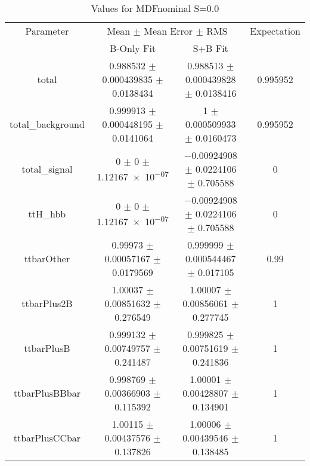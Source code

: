 \begin{table}
\centering
\caption{Values for MDFnominal S=0.0}
\begin{tabular}{cccc}
\toprule
Parameter & \multicolumn{2}{c}{Mean $\pm$ Mean Error $\pm$ RMS} & Expectation\\
 & B-Only Fit & S+B Fit & \\
\midrule
total & \num{0.988532} $\pm$ \num{0.000439835} $\pm$ \num{0.0138434} & \num{0.988513} $\pm$ \num{0.000439828} $\pm$ \num{0.0138416} & \num{0.995952}\\
total\_background & \num{0.999913} $\pm$ \num{0.000448195} $\pm$ \num{0.0141064} & \num{1} $\pm$ \num{0.000509933} $\pm$ \num{0.0160473} & \num{0.995952}\\
total\_signal & \num{0} $\pm$ \num{0} $\pm$ \num{1.12167e-07} & \num{-0.00924908} $\pm$ \num{0.0224106} $\pm$ \num{0.705588} & \num{0}\\
ttH\_hbb & \num{0} $\pm$ \num{0} $\pm$ \num{1.12167e-07} & \num{-0.00924908} $\pm$ \num{0.0224106} $\pm$ \num{0.705588} & \num{0}\\
ttbarOther & \num{0.99973} $\pm$ \num{0.00057167} $\pm$ \num{0.0179569} & \num{0.999999} $\pm$ \num{0.000544467} $\pm$ \num{0.017105} & \num{0.99}\\
ttbarPlus2B & \num{1.00037} $\pm$ \num{0.00851632} $\pm$ \num{0.276549} & \num{1.00007} $\pm$ \num{0.00856061} $\pm$ \num{0.277745} & \num{1}\\
ttbarPlusB & \num{0.999132} $\pm$ \num{0.00749757} $\pm$ \num{0.241487} & \num{0.999825} $\pm$ \num{0.00751619} $\pm$ \num{0.241836} & \num{1}\\
ttbarPlusBBbar & \num{0.998769} $\pm$ \num{0.00366903} $\pm$ \num{0.115392} & \num{1.00001} $\pm$ \num{0.00428807} $\pm$ \num{0.134901} & \num{1}\\
ttbarPlusCCbar & \num{1.00115} $\pm$ \num{0.00437576} $\pm$ \num{0.137826} & \num{1.00006} $\pm$ \num{0.00439546} $\pm$ \num{0.138485} & \num{1}\\
\bottomrule
\end{tabular}
\end{table}